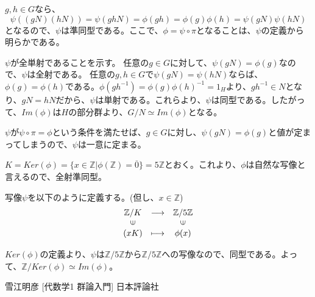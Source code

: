 \documentclass[dvipdfmx,autodetect-engine]{jsarticle}
\begin{document}
$g, h \in G$なら、
$$
\psi((gN)(hN)) = \psi(ghN) = \phi(gh) = \phi(g)\phi(h) =\psi(gN)\psi(hN)
$$
となるので、$\psi$は準同型である。ここで、$\phi = \psi \circ \pi$となることは、$\psi$の定義から明らかである。

$\psi$が全単射であることを示す。
任意の$g \in G$に対して、$\psi(gN) = \phi(g)$なので、$\psi$は全射である。
任意の$g, h \in G$で$\psi(gN) = \psi(hN)$ならば、$\phi(g) = \phi(h)$である。$\phi(gh^{-1}) = \phi(g)\phi(h)^{-1} = 1_H$より、$gh^{-1} \in N$となり、$gN = hN$だから、$\psi$は単射である。これらより、$\psi$は同型である。したがって、$Im(\phi)$は$H$の部分群より、$G/N \simeq Im(\phi)$となる。

$\psi$が$\psi \circ \pi = \phi$という条件を満たせば、$g \in G$に対し、$\psi(gN) = \phi(g)$と値が定まってしまうので、$\psi$は一意に定まる。



$K = Ker(\phi) = \{x \in \mathbb{Z}| \phi(\mathbb{Z}) = \overline{0}\} = 5\mathbb{Z}$とおく。これより、$\phi$は自然な写像と言えるので、全射準同型。

写像$\psi$を以下のように定義する。(但し、$x \in \mathbb{Z}$)
$$
\begin{array}{ccc}
\mathbb{Z}/K & {\longrightarrow}  & \mathbb{Z}/5\mathbb{Z} \\
\rotatebox{90}{$\in$} & & \rotatebox{90}{$\in$} \\
(xK) & \longmapsto & \phi(x)
\end{array}
$$

$Ker(\phi)$の定義より、$\psi$は$\mathbb{Z}/5\mathbb{Z}$から$\mathbb{Z}/5\mathbb{Z}$への写像なので、同型である。よって、$\mathbb{Z}/Ker(\phi) \simeq Im(\phi)$。

\begin{thebibliography}{n}
 雪江明彦 [代数学1 群論入門] 日本評論社
\end{thebibliography}
\end{document}
